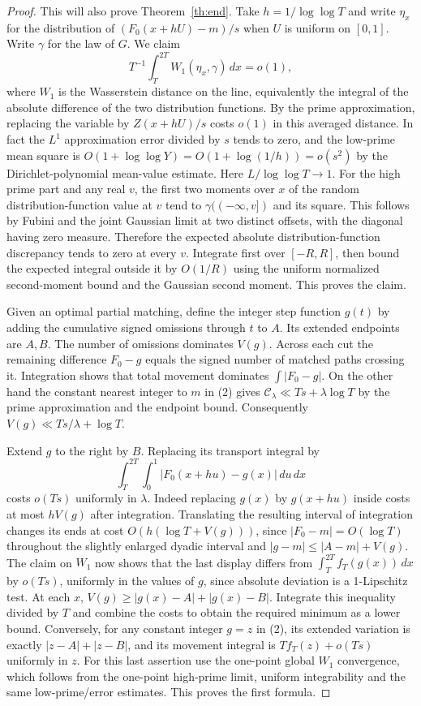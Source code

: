 \documentclass[11pt]{article}
\newcommand{\cost}{\mathcal C}
\begin{document}
\begin{proof}
This will also prove Theorem~\ref{th:end}. Take $h=1/\log\log T$ and write $\eta_x$ for the distribution of $(F_0(x+hU)-m)/s$ when $U$ is uniform on $[0,1]$. Write $\gamma$ for the law of $G$. We claim
\[
 T^{-1}\int_T^{2T}W_1(\eta_x,\gamma)\,dx=o(1),
\]
where $W_1$ is the Wasserstein distance on the line, equivalently the integral of the absolute difference of the two distribution functions. By the prime approximation, replacing the variable by $Z(x+hU)/s$ costs $o(1)$ in this averaged distance. In fact the $L^1$ approximation error divided by $s$ tends to zero, and the low-prime mean square is $O(1+\log\log Y)=O(1+\log(1/h))=o(s^2)$ by the Dirichlet-polynomial mean-value estimate. Here $L/\log\log T\to1$. For the high prime part and any real $v$, the first two moments over $x$ of the random distribution-function value at $v$ tend to $\gamma(({-}\infty,v])$ and its square. This follows by Fubini and the joint Gaussian limit at two distinct offsets, with the diagonal having zero measure. Therefore the expected absolute distribution-function discrepancy tends to zero at every $v$. Integrate first over $[-R,R]$, then bound the expected integral outside it by $O(1/R)$ using the uniform normalized second-moment bound and the Gaussian second moment. This proves the claim.

Given an optimal partial matching, define the integer step function $g(t)$ by adding the cumulative signed omissions through $t$ to $A$. Its extended endpoints are $A,B$. The number of omissions dominates $V(g)$. Across each cut the remaining difference $F_0-g$ equals the signed number of matched paths crossing it. Integration shows that total movement dominates $\int |F_0-g|$. On the other hand the constant nearest integer to $m$ in (2) gives $\cost_\lambda\ll Ts+\lambda\log T$ by the prime approximation and the endpoint bound. Consequently $V(g)\ll Ts/\lambda+\log T$.

Extend $g$ to the right by $B$. Replacing its transport integral by
\[
 \int_T^{2T}\!\int_0^1 |F_0(x+hu)-g(x)|\,du\,dx
\]
costs $o(Ts)$ uniformly in $\lambda$. Indeed replacing $g(x)$ by $g(x+hu)$ inside costs at most $hV(g)$ after integration. Translating the resulting interval of integration changes its ends at cost $O(h(\log T+V(g)))$, since $|F_0-m|=O(\log T)$ throughout the slightly enlarged dyadic interval and $|g-m|\le |A-m|+V(g)$. The claim on $W_1$ now shows that the last display differs from $\int_T^{2T}f_T(g(x))\,dx$ by $o(Ts)$, uniformly in the values of $g$, since absolute deviation is a 1-Lipschitz test. At each $x$, $V(g)\ge |g(x)-A|+|g(x)-B|$. Integrate this inequality divided by $T$ and combine the costs to obtain the required minimum as a lower bound. Conversely, for any constant integer $g=z$ in (2), its extended variation is exactly $|z-A|+|z-B|$, and its movement integral is $Tf_T(z)+o(Ts)$ uniformly in $z$. For this last assertion use the one-point global $W_1$ convergence, which follows from the one-point high-prime limit, uniform integrability and the same low-prime/error estimates. This proves the first formula.


\end{proof}
\end{document}
